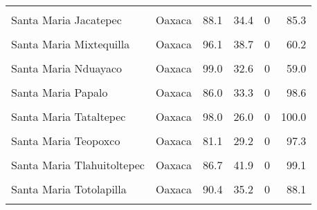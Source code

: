 \documentclass[
]{report}
\begin{document}
\begin{longtable}[t]{llrrrr}
\cellcolor{gray!6}{Santa Maria Ixcatlan} & \cellcolor{gray!6}{Oaxaca} & \cellcolor{gray!6}{95.7} & \cellcolor{gray!6}{27.3} & \cellcolor{gray!6}{0} & \cellcolor{gray!6}{61.2}\\
Santa Maria Jacatepec & Oaxaca & 88.1 & 34.4 & 0 & 85.3\\
\cellcolor{gray!6}{Santa Maria Lachixio} & \cellcolor{gray!6}{Oaxaca} & \cellcolor{gray!6}{77.5} & \cellcolor{gray!6}{26.0} & \cellcolor{gray!6}{0} & \cellcolor{gray!6}{96.1}\\
\addlinespace
Santa Maria Mixtequilla & Oaxaca & 96.1 & 38.7 & 0 & 60.2\\
\cellcolor{gray!6}{Santa Maria Nativitas} & \cellcolor{gray!6}{Oaxaca} & \cellcolor{gray!6}{98.0} & \cellcolor{gray!6}{41.9} & \cellcolor{gray!6}{0} & \cellcolor{gray!6}{85.9}\\
Santa Maria Nduayaco & Oaxaca & 99.0 & 32.6 & 0 & 59.0\\
\cellcolor{gray!6}{Santa Maria Ozolotepec} & \cellcolor{gray!6}{Oaxaca} & \cellcolor{gray!6}{83.8} & \cellcolor{gray!6}{34.5} & \cellcolor{gray!6}{0} & \cellcolor{gray!6}{90.5}\\
Santa Maria Papalo & Oaxaca & 86.0 & 33.3 & 0 & 98.6\\
\addlinespace
\cellcolor{gray!6}{Santa Maria Quiegolani} & \cellcolor{gray!6}{Oaxaca} & \cellcolor{gray!6}{79.5} & \cellcolor{gray!6}{34.2} & \cellcolor{gray!6}{0} & \cellcolor{gray!6}{98.0}\\
Santa Maria Tataltepec & Oaxaca & 98.0 & 26.0 & 0 & 100.0\\
\cellcolor{gray!6}{Santa Maria Temaxcalapa} & \cellcolor{gray!6}{Oaxaca} & \cellcolor{gray!6}{97.0} & \cellcolor{gray!6}{41.6} & \cellcolor{gray!6}{0} & \cellcolor{gray!6}{99.6}\\
Santa Maria Teopoxco & Oaxaca & 81.1 & 29.2 & 0 & 97.3\\
\cellcolor{gray!6}{Santa Maria Texcatitlan} & \cellcolor{gray!6}{Oaxaca} & \cellcolor{gray!6}{85.7} & \cellcolor{gray!6}{50.5} & \cellcolor{gray!6}{0} & \cellcolor{gray!6}{97.3}\\
\addlinespace
Santa Maria Tlahuitoltepec & Oaxaca & 86.7 & 41.9 & 0 & 99.1\\
\cellcolor{gray!6}{Santa Maria Tonameca} & \cellcolor{gray!6}{Oaxaca} & \cellcolor{gray!6}{81.3} & \cellcolor{gray!6}{35.4} & \cellcolor{gray!6}{0} & \cellcolor{gray!6}{54.1}\\
Santa Maria Totolapilla & Oaxaca & 90.4 & 35.2 & 0 & 88.1\\
\cellcolor{gray!6}{Santa Maria Yalina} & \cellcolor{gray!6}{Oaxaca} & \cellcolor{gray!6}{96.7} & \cellcolor{gray!6}{32.0} & \cellcolor{gray!6}{0} & \cellcolor{gray!6}{96.7}\\

\end{longtable}
\end{document}
